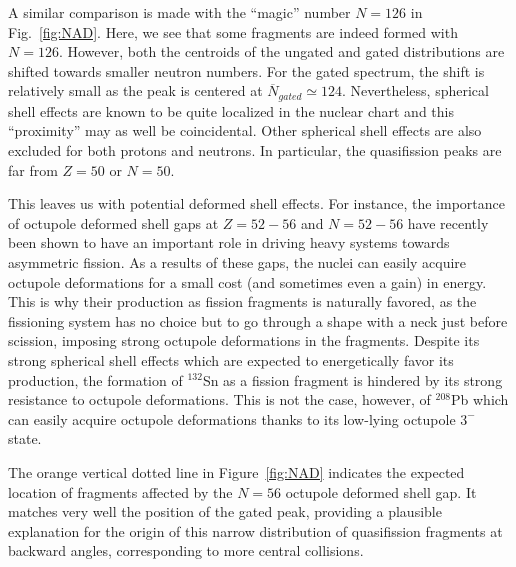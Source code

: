 A similar comparison is made with the ``magic'' number $N=126$ in Fig.~\ref{fig:NAD}.
Here, we see that some fragments are indeed formed with $N=126$.
However, both the centroids of the ungated and gated distributions are shifted towards smaller neutron numbers.
For the gated spectrum, the shift is relatively small as the peak is centered at $\overline{N}_{gated}\simeq124$. Nevertheless, spherical shell effects are known to be quite localized in the nuclear chart and this ``proximity'' may as well be coincidental.
Other spherical shell effects are also excluded for both protons and neutrons.
In particular, the quasifission peaks are far from $Z=50$ or $N=50$.

This leaves us with potential deformed shell effects.
For instance, the importance of octupole deformed shell gaps at $Z=52-56$ \citep{scamps2018} and $N=52-56$ \citep{scamps2019} have recently been shown to have an important role in driving heavy systems towards asymmetric fission.
As a results of these gaps, the nuclei can easily acquire octupole deformations for a small cost (and sometimes even a gain) in energy.
This is why their production as fission fragments is naturally favored, as the fissioning system has no choice but to go through a shape with a neck just before scission, imposing strong octupole deformations in the fragments.
Despite its strong spherical shell effects which are expected to energetically favor its production, the formation of $^{132}$Sn as a fission fragment is hindered by its strong resistance to octupole deformations.
This is not the case, however, of $^{208}$Pb which can easily acquire octupole deformations thanks to its low-lying octupole $3^-$ state.

The orange vertical dotted line in Figure~\ref{fig:NAD} indicates the expected location of fragments affected by the $N=56$ octupole deformed shell gap.
It matches very well the position of the gated peak, providing a plausible explanation for the origin of this narrow distribution of quasifission fragments at backward angles, corresponding to more central collisions.

